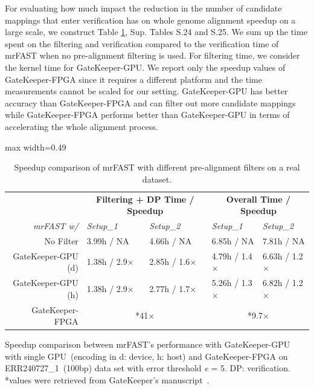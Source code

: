 For evaluating how much impact the reduction in the number of candidate mappings that enter verification has on whole genome alignment speedup on a large scale, we construct Table \ref{tab:wholegenspeedup}, Sup. Tables S.24 and S.25. We sum up the time spent on the filtering and verification compared to the verification time of mrFAST when no pre-alignment filtering is used. For filtering time, we consider the kernel time for GateKeeper-GPU. We report only the speedup values of GateKeeper-FPGA since it requires a different platform and the time measurements cannot be scaled for our setting. GateKeeper-GPU has better accuracy than GateKeeper-FPGA and can filter out more candidate mappings while GateKeeper-FPGA performs better than GateKeeper-GPU in terms of accelerating the whole alignment process.

\begin{table}[!htbp]
\caption{Speedup comparison of mrFAST with different pre-alignment filters on a real dataset.}
\label{tab:wholegenspeedup}
\begin{adjustbox}{max width=0.49\textwidth}
\Large
\begin{tabular}{r|ll|ll}
\multicolumn{1}{c}{} & \multicolumn{2}{c}{\textbf{Filtering + DP Time / Speedup} }   & \multicolumn{2}{c}{\textbf{Overall Time / Speedup} }  \\
\rule{0pt}{3ex}
 \textit{mrFAST w/}  & \textit{Setup\_1}    & \multicolumn{1}{l}{\textit{Setup\_2} } & \textit{Setup\_1}    & \textit{Setup\_2}              \\ 
\hline \rule{0pt}{2ex}
No Filter            & 3.99h / NA            & 4.66h / NA                             & 6.85h / NA           & 7.81h / NA                     \\
GateKeeper-GPU (d)   & 1.38h / 2.9$\times$  & 2.85h / 1.6$\times$                    & 4.79h / 1.4$\times$  & 6.63h / 1.2$\times$            \\
GateKeeper-GPU (h)   & 1.38h / 2.9$\times$  & 2.77h / 1.7$\times$                    & 5.26h / 1.3$\times$  & 6.82h / 1.2$\times$            \\
GateKeeper-FPGA      & \multicolumn{2}{c|}{*41$\times$ }                             & \multicolumn{2}{c}{*9.7$\times$ }                     \\
\hline
\end{tabular}
\end{adjustbox}
\begin{minipage}{0.49\textwidth}
\vspace*{0.2cm}
\scriptsize
Speedup comparison between mrFAST's performance with GateKeeper-GPU with single GPU~(encoding in d: device, h: host) and GateKeeper-FPGA on ERR240727\_1~(100bp) data set with error threshold \textit{e} = 5. DP: verification. *values were retrieved from GateKeeper's manuscript~\cite{Alser2017}.
\end{minipage}
\end{table}

